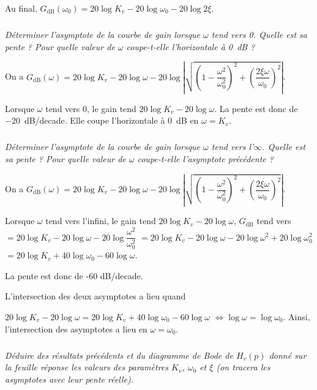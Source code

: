 \documentclass[10pt,fleqn]{article} %
\begin{document}
\begin{multicols}{2}
\begin{corrige}
Au final, 
$G_{\text{dB}}\left(\omega_0 \right)=
20\log K_v- 20\log  \omega_0 - 20\log 2\xi $.
\end{corrige} \else \fi

\subparagraph{}\textit{Déterminer l'asymptote de la courbe de gain lorsque 
$\omega$ tend vers 0. Quelle est sa pente ?
Pour quelle valeur de $\omega$ coupe-t-elle l'horizontale à \SI{0}{dB} ?}

\ifprof \begin{corrige}
On a $G_{\text{dB}}\left(\omega \right)
=20\log K_v- 20\log  \omega - 20\log  \left| \sqrt{\left(1- \dfrac{\omega^2}{\omega_0^2} \right)^2+\left( \dfrac{2\xi\omega }{\omega_0} \right)^2} \right|$. 

Lorsque $\omega$ tend vers 0, le gain tend $20\log K_v- 20\log  \omega$.
 La pente est donc de \SI{-20}{dB/decade}. Elle coupe l'horizontale à \SI{0}{dB} en $\omega=K_v$.

\end{corrige} \else \fi

\subparagraph{}\textit{Déterminer l'asymptote de la courbe de gain lorsque $\omega$ tend vers l'$\infty$. Quelle est sa pente ?	
Pour quelle valeur de $\omega$ coupe-t-elle l'asymptote précédente ?}


\ifprof \begin{corrige}
On a $G_{\text{dB}}\left(\omega \right)
=20\log K_v- 20\log  \omega - 20\log  \left| \sqrt{\left(1- \dfrac{\omega^2}{\omega_0^2} \right)^2+\left( \dfrac{2\xi\omega }{\omega_0} \right)^2} \right|$. 

Lorsque $\omega$ tend vers l'infini, le gain tend $20\log K_v- 20\log  \omega$, 
$G_{\text{dB}}$ tend vers 
$= 20\log K_v- 20\log  \omega - 20\log  \dfrac{\omega^2}{\omega_0^2} $
$= 20\log K_v- 20\log  \omega - 20\log  \omega^2 +20\log  \omega_0^2 $
$= 20\log K_v+ 40\log  \omega_0 - 60\log  \omega $.

La pente est donc de -60 dB/decade.

L'intersection des deux asymptotes a lieu quand 

$20\log K_v- 20\log  \omega= 20\log K_v+40\log  \omega_0 - 60\log  \omega$
$\Leftrightarrow \log  \omega= \log  \omega_0 $. Ainsi, l'intersection des asymptotes a lieu en $\omega=\omega_0$. 
\end{corrige} \else \fi

\subparagraph{}\textit{Déduire des résultats précédents et du diagramme de Bode de $H_v(p)$ donné sur la feuille réponse les valeurs des paramètres $K_v$, $\omega_0$ et $\xi$ (on tracera les asymptotes avec leur pente réelle).}


\end{multicols}
\end{document}
